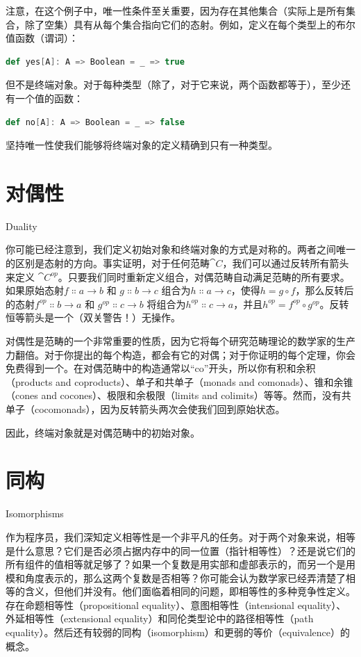 注意，在这个例子中，唯一性条件至关重要，因为存在其他集合（实际上是所有集合，除了空集）具有从每个集合指向它们的态射。例如，定义在每个类型上的布尔值函数（谓词）：

\begin{lstlisting}[language=Scala]
def yes[A]: A => Boolean = _ => true
\end{lstlisting}
但不是终端对象。对于每种类型（除了，对于它来说，两个函数都等于），至少还有一个值的函数：

\begin{lstlisting}[language=Scala]
def no[A]: A => Boolean = _ => false
\end{lstlisting}
坚持唯一性使我们能够将终端对象的定义精确到只有一种类型。

\section{对偶性}{Duality}

你可能已经注意到，我们定义初始对象和终端对象的方式是对称的。两者之间唯一的区别是态射的方向。事实证明，对于任何范畴$\cat{C}$，我们可以通过反转所有箭头来定义 $\cat{C}^\mathit{op}$。只要我们同时重新定义组合，对偶范畴自动满足范畴的所有要求。如果原始态射$f \Colon a \to b$ 和 $g \Colon b \to c$ 组合为$h \Colon a \to c$，使得$h = g \circ f$，那么反转后的态射$f^\mathit{op} \Colon b \to a$ 和 $g^\mathit{op} \Colon c \to b$ 将组合为$h^\mathit{op} \Colon c \to a$，并且$h^\mathit{op} = f^\mathit{op} \circ g^\mathit{op}$。反转恒等箭头是一个（双关警告！）无操作。

对偶性是范畴的一个非常重要的性质，因为它将每个研究范畴理论的数学家的生产力翻倍。对于你提出的每个构造，都会有它的对偶；对于你证明的每个定理，你会免费得到一个。在对偶范畴中的构造通常以“co”开头，所以你有积和余积（products and coproducts）、单子和共单子（monads and comonads）、锥和余锥（cones and cocones）、极限和余极限（limits and colimits）等等。然而，没有共单子（cocomonads），因为反转箭头两次会使我们回到原始状态。

因此，终端对象就是对偶范畴中的初始对象。

\section{同构}{Isomorphisms}

作为程序员，我们深知定义相等性是一个非平凡的任务。对于两个对象来说，相等是什么意思？它们是否必须占据内存中的同一位置（指针相等性）？还是说它们的所有组件的值相等就足够了？如果一个复数是用实部和虚部表示的，而另一个是用模和角度表示的，那么这两个复数是否相等？你可能会认为数学家已经弄清楚了相等的含义，但他们并没有。他们面临着相同的问题，即相等性的多种竞争性定义。存在命题相等性（propositional equality）、意图相等性（intensional equality）、外延相等性（extensional equality）和同伦类型论中的路径相等性（path equality）。然后还有较弱的同构（isomorphism）和更弱的等价（equivalence）的概念。

